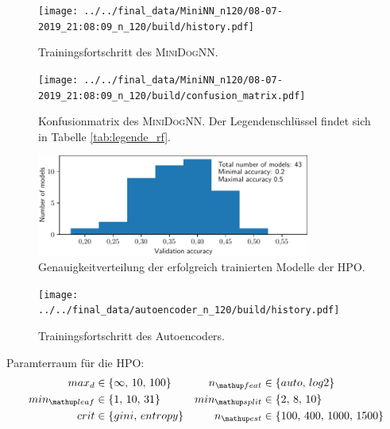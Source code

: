 \begin{figure}
\centering
\centering
\texttt{[image: ../../final\_data/MiniNN\_n120/08-07-2019\_21:08:09\_n\_120/build/history.pdf]}
\caption{Trainingsfortschritt des \textsc{MiniDogNN}.}
\label{fig:MiniDogNN_120_Loss_Acc}
\end{figure}
\begin{figure}
\centering
\texttt{[image: ../../final\_data/MiniNN\_n120/08-07-2019\_21:08:09\_n\_120/build/confusion\_matrix.pdf]}
\caption{Konfusionmatrix des \textsc{MiniDogNN}. Der Legendenschlüssel findet sich in
Tabelle \ref{tab:legende_rf}.}
\label{fig:MiniDogNN_120_Konfusionmatrix}
\end{figure}

\begin{figure}
\centering
\includegraphics[width=0.8\textwidth]{../../final_data/MiniNN_n5/acc_hist.pdf}
\caption{Genauigkeitverteilung der erfolgreich trainierten Modelle der HPO.}
\label{fig:Genauigkeitverteilung_MiniDogNN}
\end{figure}

\begin{figure}
\centering
\centering
\texttt{[image: ../../final\_data/autoencoder\_n\_120/build/history.pdf]}
\caption{Trainingsfortschritt des Autoencoders.}
\label{fig:Autoencoder_loss}
\end{figure}

Paramterraum für die HPO:
\begin{align}
  \begin{aligned}
    \label{eq: rf_parameter_raum}
    max_d &\in \left\{\infty,\, 10,\, 100\right\} & n\ua{feat}&\in\left\{auto, \,log2\right\}\\
    min\ua{leaf} &\in \left\{1,\, 10,\, 31\right\} & min\ua{split}&\in\left\{2,\, 8,\, 10\right\}\\
    crit &\in \left\{gini,\, entropy\right\} & n\ua{est}&\in\left\{100,\, 400,\, 1000,\, 1500 \right\}
  \end{aligned}
\end{align}


